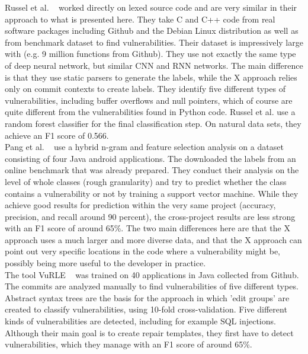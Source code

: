 \documentclass[
	a4paper,
	pagesize,
	pdftex,
	12pt,
	twoside, %
	BCOR=5mm, %
	ngerman,
	fleqn,
	final,
	]{scrartcl}
\begin{document}
Russel et al. ~\cite{Russell.2018} worked directly on lexed source code and are very similar in their approach to what is presented here. They take C and C++ code from real software packages including Github and the Debian Linux distribution as well as from benchmark dataset to find vulnerabilities. Their dataset is impressively large with (e.g. 9 million functions from Github). They use not exactly the same type of deep neural network, but similar CNN and RNN networks. The main difference is that they use static parsers to generate the labels, while the X approach relies only on commit contexts to create labels. They identify five different types of vulnerabilities, including buffer overflows and null pointers, which of course are quite different from the vulnerabilities found in Python code. Russel et al. use a random forest classifier for the final classification step. On natural data sets, they achieve an F1 score of 0.566.\\

Pang et al. ~\cite{Pang.2015} use a hybrid n-gram and feature selection analysis on a dataset consisting of four Java android applications. The downloaded the labels from an online benchmark that was already prepared. They conduct their analysis on the level of whole classes (rough granularity) and try to predict whether the class contains a vulnerability or not by training a support vector machine. While they achieve good results for prediction within the very same project (accuracy, precision, and recall around 90 percent), the cross-project results are less strong with an F1 score of around 65\%. The two main differences here are that the X approach uses a much larger and more diverse data, and that the X approach can point out very specific locations in the code where a vulnerability might be, possibly being more useful to the developer in practice.\\

The tool VuRLE ~\cite{Ma.2017} was trained on 40 applications in Java collected from Github. The commits are analyzed manually to find vulnerabilities of five different types. Abstract syntax trees are the basis for the approach in which 'edit groups' are created to classify vulnerabilities, using 10-fold cross-validation. Five different kinds of vulnerabilities are detected, including for example SQL injections. Although their main goal is to create repair templates, they first have to detect vulnerabilities, which they manage with an F1 score of around 65\%. \\
\end{document}
